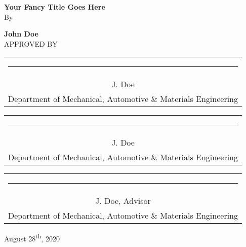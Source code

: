 \newpage %
\pagestyle{empty} %
{\centering
	\vspace{4cm}
	{\large\bfseries Your Fancy Title Goes Here\\}
	\vspace{1cm}
	By\par
	\vspace{1cm}
	{\bfseries John Doe\\}
	\vfill
	APPROVED BY\\
	\vfill
	\begin{tabular}[t]{c}
           \rule{15em}{0.4pt}\\
           J. Doe\\
	Department of Mechanical, Automotive \& Materials Engineering \\
           \end{tabular}
	   
	\vspace{1.5cm}
	\begin{tabular}[t]{c}
           \rule{15em}{0.4pt}\\
           J. Doe\\
	Department of Mechanical, Automotive \& Materials Engineering \\
           \end{tabular}
	   
	\vspace{1.5cm}
	\begin{tabular}[t]{c}
           \rule{15em}{0.4pt}\\
           J. Doe, Advisor\\
	Department of Mechanical, Automotive \& Materials Engineering \\
           \end{tabular}
	\vfill
	\hfill August 28\textsuperscript{th}, 2020
}